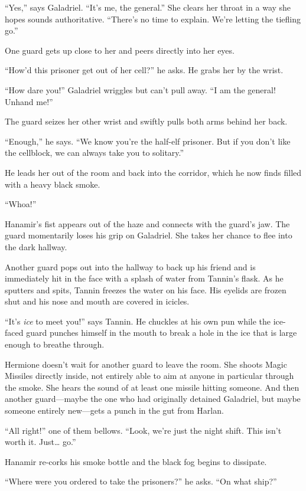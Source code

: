 \documentclass[smalldemyvopaper,11pt,twoside,onecolumn,openright,extrafontsizes]{memoir}
\begin{document}
``Yes,'' says Galadriel. ``It's me, the general.'' She clears her throat
in a way she hopes sounds authoritative. ``There's no time to explain.
We're letting the tiefling go.''

One guard gets up close to her and peers directly into her eyes.

``How'd this prisoner get out of her cell?'' he asks. He grabs her by
the wrist.

``How dare you!'' Galadriel wriggles but can't pull away. ``I am the
general! Unhand me!''

The guard seizes her other wrist and swiftly pulls both arms behind her
back.

``Enough,'' he says. ``We know you're the half-elf prisoner. But if you
don't like the cellblock, we can always take you to solitary.''

He leads her out of the room and back into the corridor, which he now
finds filled with a heavy black smoke.

``Whoa!''

Hanamir's fist appears out of the haze and connects with the guard's
jaw. The guard momentarily loses his grip on Galadriel. She takes her
chance to flee into the dark hallway.

Another guard pops out into the hallway to back up his friend and is
immediately hit in the face with a splash of water from Tannin's flask.
As he sputters and spits, Tannin freezes the water on his face. His
eyelids are frozen shut and his nose and mouth are covered in icicles.

``It's \emph{ice} to meet you!'' says Tannin. He chuckles at his own pun
while the ice-faced guard punches himself in the mouth to break a hole
in the ice that is large enough to breathe through.

Hermione doesn't wait for another guard to leave the room. She shoots
Magic Missiles directly inside, not entirely able to aim at anyone in
particular through the smoke. She hears the sound of at least one
missile hitting someone. And then another guard---maybe the one who had
originally detained Galadriel, but maybe someone entirely new---gets a
punch in the gut from Harlan.

``All right!'' one of them bellows. ``Look, we're just the night shift.
This isn't worth it. Just\ldots{} go.''

Hanamir re-corks his smoke bottle and the black fog begins to dissipate.

``Where were you ordered to take the prisoners?'' he asks. ``On what
ship?''
\end{document}

